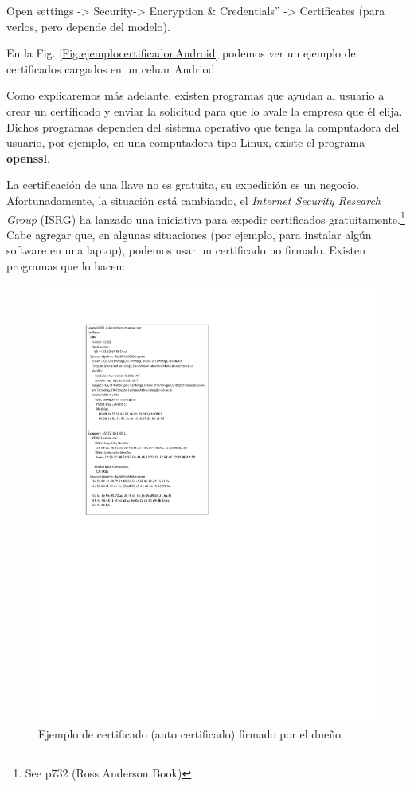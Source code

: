 \documentclass[12pt]{report} %
\begin{document}
Open settings -> Security-> Encryption \& Credentials” -> Certificates (para verlos, pero depende del modelo). 

En la Fig. \ref{Fig.ejemplocertificadonAndroid} podemos ver un ejemplo de certificados cargados en un celuar Andriod


Como explicaremos más adelante, existen programas que ayudan al usuario a crear un certificado y enviar la solicitud para que lo avale la empresa que él elija. Dichos programas dependen del sistema operativo que tenga la computadora del usuario, por ejemplo, en una computadora tipo Linux, existe el programa \textbf{openssl}.

La certificación de una llave no es gratuita, su expedición es un negocio. Afortunadamente, la situación está cambiando, el \textit{Internet Security Research Group}  (ISRG) ha lanzado una iniciativa para expedir certificados gratuitamente.\footnote{See p732 (Ross Anderson Book)}  Cabe agregar que, en algunas situaciones (por ejemplo, para instalar algún software en una laptop), podemos usar un certificado no firmado. Existen programas que lo hacen:



\begin{figure}
\centering
\includegraphics[width=0.85\columnwidth]{imagenes/certfirmadodueno.pdf}
\caption{Ejemplo de certificado (auto certificado) firmado por el dueño.}
\label{Fig.ejemplocertificadofirmadodueno}
\end{figure} 
\end{document}
